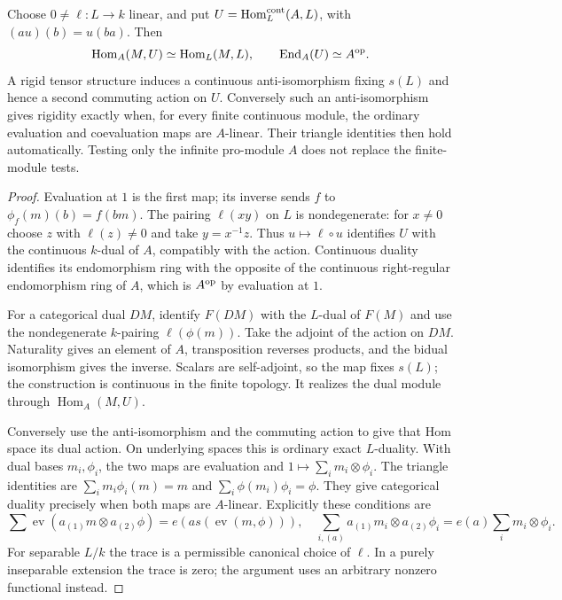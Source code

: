 \begin{proposition}\label{prop:continuous-dual-and-rigidity}
Choose $0\ne\ell:L\to k$ linear, and put
$U=\operatorname{Hom}^{\rm cont}_L(A,L)$, with
$(au)(b)=u(ba)$. Then
\[
 \operatorname{Hom}_A(M,U)\simeq\operatorname{Hom}_L(M,L),\qquad
 \operatorname{End}_A(U)\simeq A^{\rm op}.
\]
A rigid tensor structure induces a continuous anti-isomorphism
fixing $s(L)$ and hence a second commuting action on $U$.
Conversely such an anti-isomorphism gives rigidity exactly when,
for every finite continuous module, the ordinary evaluation and
coevaluation maps are $A$-linear. Their triangle identities then
hold automatically. Testing only the infinite pro-module $A$
does not replace the finite-module tests.
\end{proposition}
\begin{proof}
Evaluation at $1$ is the first map; its inverse sends $f$ to
$\phi_f(m)(b)=f(bm)$. The pairing $\ell(xy)$ on $L$ is
nondegenerate: for $x\ne0$ choose $z$ with $\ell(z)\ne0$ and
take $y=x^{-1}z$. Thus $u\mapsto\ell\circ u$ identifies $U$
with the continuous $k$-dual of $A$, compatibly with the action.
Continuous duality identifies its endomorphism ring with the
opposite of the continuous right-regular endomorphism ring of $A$,
which is $A^{\rm op}$ by evaluation at $1$.

For a categorical dual $DM$, identify $F(DM)$ with the $L$-dual
of $F(M)$ and use the nondegenerate $k$-pairing
$\ell(\phi(m))$. Take the adjoint of the action on $DM$.
Naturality gives an element of $A$, transposition reverses
products, and the bidual isomorphism gives the inverse. Scalars
are self-adjoint, so the map fixes $s(L)$; the construction is
continuous in the finite topology. It realizes the dual module
through $\operatorname{Hom}_A(M,U)$.

Conversely use the anti-isomorphism and the commuting action to
give that Hom space its dual action. On underlying spaces this
is ordinary exact $L$-duality. With dual bases $m_i,\phi_i$,
the two maps are evaluation and $1\mapsto\sum_i m_i\otimes\phi_i$.
The triangle identities are
$\sum_i m_i\phi_i(m)=m$ and
$\sum_i\phi(m_i)\phi_i=\phi$. They give categorical duality
precisely when both maps are $A$-linear. Explicitly these conditions
are
\[
 \sum\operatorname{ev}(a_{(1)}m\otimes a_{(2)}\phi)
       =e(a s(\operatorname{ev}(m,\phi))),
 \quad
 \sum_{i,(a)}a_{(1)}m_i\otimes a_{(2)}\phi_i
       =e(a)\sum_i m_i\otimes\phi_i.
\]
For separable $L/k$ the trace is a permissible canonical choice of
$\ell$. In a purely inseparable extension the trace is zero; the
argument uses an arbitrary nonzero functional instead.
\end{proof}


